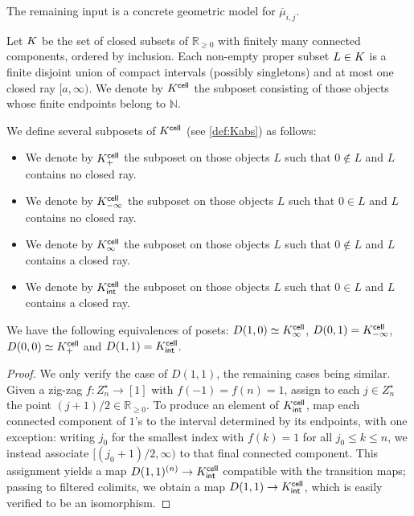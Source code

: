 \documentclass[a4paper,reqno,twoside]{amsart}
\begin{document}
The remaining input is a concrete geometric model for $\overline{\mu}_{i,j}$.



\begin{definition}\label{def:Kabs}
	Let $\relax{K}$ be the set of closed subsets of $\mathbb{R}_{\geq 0}$ with finitely many connected components, ordered by inclusion. Each non-empty proper subset $L \in \relax{K}$ is a finite disjoint union of compact intervals (possibly singletons) and at most one closed ray $[a,\infty)$. We denote by $\relax{K}^{\mathsf{cell}}$ the subposet consisting of those objects whose finite endpoints belong to $\mathbb{N}$.
\end{definition}

\begin{definition}\label{def:Ksepinfty}
	We define several subposets of $\relax{K}^{\mathsf{cell}}$ (see \cref{def:Kabs}) as follows:
	\begin{itemize}
		\item We denote by $\relax{K}^{\mathsf{cell}}_+$ the subposet on those objects $L$ such that $0 \notin L$ and $L$ contains no closed ray.
		\item We denote by $\relax{K}^{\mathsf{cell}}_{-\infty}$ the subposet on those objects $L$ such that $0 \in L$ and $L$ contains no closed ray.
		\item We denote by $\relax{K}^{\mathsf{cell}}_{\infty}$ the subposet on those objects $L$ such that $0 \notin L$ and $L$ contains a closed ray.
		\item We denote by $\relax{K}^{\mathsf{cell}}_{\mathsf{int}}$ the subposet on those objects $L$ such that $0 \in L$ and $L$ contains a closed ray.
	\end{itemize}
\end{definition}

\begin{lemma}\label{lem:posetgeom}
	We have the following equivalences of posets: $D(1,0)\simeq \relax{K}^{\mathsf{cell}}_{\infty}$, $D(0,1)=\relax{K}^{\mathsf{cell}}_{-\infty}$, $D(0,0) \simeq \relax{K}^{\mathsf{cell}}_+$ and $D(1,1)=\relax{K}^{\mathsf{cell}}_{\mathsf{int}}$.
\end{lemma}
\begin{proof}
	We only verify the case of $D(1,1)$, the remaining cases being similar. Given a zig-zag $f \colon Z_n^{\star} \to [1]$ with $f(-1)=f(n)=1$, assign to each $j \in Z_n^{\star}$ the point $(j+1)/2 \in \mathbb{R}_{\geq 0}$. To produce an element of $\relax{K}^{\mathsf{cell}}_{\mathsf{int}}$, map each connected component of $1$'s to the interval determined by its endpoints, with one exception: writing $j_0$ for the smallest index with $f(k)=1$ for all $j_0 \leq k \leq n$, we instead associate $[(j_0+1)/2,\infty)$ to that final connected component. This assignment yields a map $D(1,1)^{(n)} \to \relax{K}^{\mathsf{cell}}_{\mathsf{int}}$ compatible with the transition maps; passing to filtered colimits, we obtain a map $D(1,1) \to \relax{K}^{\mathsf{cell}}_{\mathsf{int}}$, which is easily verified to be an isomorphism.
\end{proof}
\end{document}
